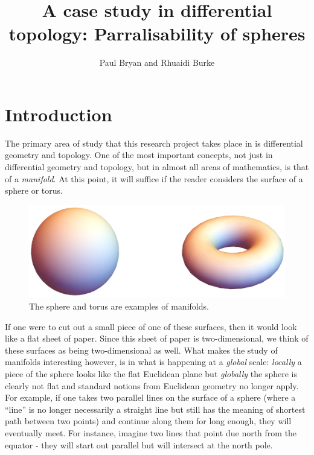 \documentclass[12pt,a4paper]{article}
\title{A case study in differential topology: Parralisability of spheres}
\author{Paul Bryan and Rhuaidi Burke}
\begin{document}
\maketitle

\section{Introduction}
The primary area of study that this research project takes place in is differential geometry and topology. One of the most important concepts, not just in differential geometry and topology, but in almost all areas of mathematics, is that of a \textit{manifold}. At this point, it will suffice if the reader considers the surface of a sphere or torus.\\

\begin{figure}[h!]
\centering
\includegraphics[scale=0.675]{fig/fig1a}
\caption{The sphere and torus are examples of manifolds.}
\end{figure}

If one were to cut out a small piece of one of these surfaces, then it would look like a flat sheet of paper. Since this sheet of paper is two-dimensional, we think of these surfaces as being two-dimensional as well. What makes the study of manifolds interesting however, is in what is happening at a \textit{global} scale: \textit{locally} a piece of the sphere looks like the flat Euclidean plane but \textit{globally} the sphere is clearly not flat and standard notions from Euclidean geometry no longer apply. For example, if one takes two parallel lines on the surface of a sphere (where a ``line'' is no longer necessarily a straight line but still has the meaning of shortest path between two points) and continue along them for long enough, they will eventually meet. For instance, imagine two lines that point due north from the equator - they will start out parallel but will intersect at the north pole.\\
\end{document}
